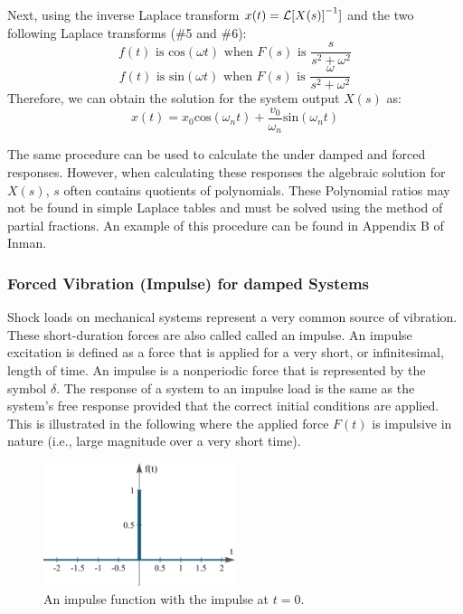 \documentclass[12pt,letter]{article}
\begin{document}
			Next, using the inverse Laplace transform $x(t) = \mathcal{L}{\left[X(s)\right]}^{-1}]$ and the two following Laplace transforms (\#5 and \#6):
			\begin{equation}
			f(t) \text{ is cos}(\omega t) \text{ when }  F(s) \text{ is } \frac{s}{s^2+\omega^2} 
			\end{equation}
			\begin{equation}
			f(t) \text{ is sin}(\omega t)  \text{ when }  F(s) \text{ is } \frac{\omega}{s^2+\omega^2} 
			\end{equation}
			Therefore, we can obtain the solution for the system output $X(s)$ as:
			\begin{equation}
			x(t) = x_0 \text{cos}(\omega_n t) + \frac{v_0}{\omega_n}\text{sin}(\omega_n t)
			\end{equation}
			
			The same procedure can be used to calculate the under damped and forced responses. However, when calculating these responses the algebraic solution for $X(s)$, $s$ often contains quotients of polynomials. These Polynomial ratios may not be found in simple Laplace tables and must be solved using the method of partial fractions. An example of this procedure can be found in Appendix B of Inman. 

			\subsubsection{Forced Vibration (Impulse) for damped Systems}
		
			Shock loads on mechanical systems represent a very common source of vibration. These short-duration forces are also called called an impulse. An impulse excitation is defined as a force that is applied for a very short, or infinitesimal, length of time. An impulse is a nonperiodic force that is represented by the symbol $\delta$. The response of a system to an impulse load is the same as the system's free response provided that the correct initial conditions are applied. This is illustrated in the following where the applied force $F(t)$ is impulsive in nature (i.e., large magnitude over a very short time).
			
			\begin{figure}[H]
				\centering
				\includegraphics[width=0.5\textwidth]{../figures/unit_impulse.png}
				\caption{An impulse function with the impulse at $t=0$. }
			\end{figure}
			
\end{document}
